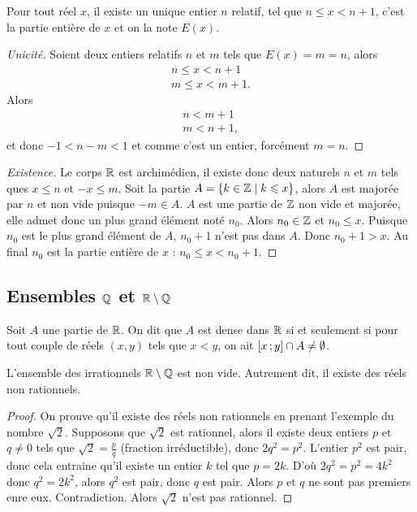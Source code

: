\begin{prop}
  Pour tout réel \(x\), il existe un unique entier \(n\) relatif, tel que
  \(n\leqslant x<n + 1\), c'est la partie entière de \(x\) et on la note
  \(E(x)\).
\end{prop}
\begin{proof}[Unicité]
  Soient deux entiers relatifs \(n\) et \(m\) tels que \(E(x) = m = n\), alors
  \begin{align}
    n\leqslant x< n + 1 \\  m\leqslant x< m + 1.
  \end{align}
  Alors
  \begin{align}
    n<m + 1 \\  m<n + 1,
  \end{align}
  et donc \( - 1<n - m<1\) et comme c'est un entier, forcément \(m = n\).
\end{proof}
\begin{proof}[Existence]
  Le corps \(\mathbb{R}\) est archimédien, il existe donc deux naturels \(n\) et \(m\)
  tels ques \(x\leqslant n\) et  \( - x\leqslant m\). Soit la partie \(A =
  \left\{k \in \mathbb{Z}\mathrel{}\middle|\mathrel{}k\leqslant x\right\}\), alors \(A\) est majorée par \(n\) et non
  vide puisque \( - m\in A\). \(A\) est une partie de \(\mathbb{Z}\) non vide et
  majorée, elle admet donc un plus grand élément noté \(n_0\). Alors \(n_0\in
  \mathbb{Z}\) et \(n_0\leqslant x\). Puisque \(n_0\) est le plus grand élément de
  \(A\), \(n_0 + 1\) n'est pas dans \(A\). Donc \(n_0 + 1>x\). Au final \(n_0\)
  est la partie entière de \(x\) : \(n_0\leqslant x<n_0 + 1\).
\end{proof}

\subsection{Ensembles \(\mathbb{Q}\) et \(\mathbb{R}\setminus\mathbb{Q}\)}

\begin{defdef}[Densité]
  Soit \(A\) une partie de \(\mathbb{R}\). On dit que \(A\) est dense dans \(\mathbb{R}\) si et
  seulement si pour tout couple de réels \((x, y)\) tels que \(x<y\), on ait
  \(\left[ x \, ; {} y \right]\cap A \neq \emptyset\).
\end{defdef}
\begin{prop}
  L'ensemble des irrationnels \(\mathbb{R}\setminus\mathbb{Q}\) est non vide. Autrement dit, il
  existe des réels non rationnels.
\end{prop}
\begin{proof}
  On prouve  qu'il existe des réels non rationnels en prenant l'exemple du
  nombre \(\sqrt{2}\). Supposons que \(\sqrt{2}\) est rationnel, alors il existe
  deux entiers \(p\) et \(q \neq 0\) tels que \(\sqrt{2} = \frac{p}{q}\)
  (fraction irréductible), donc \(2q^2 = p^2\). L'entier \(p^2\) est pair, donc
  cela entraine qu'il existe un entier \(k\) tel que \(p = 2k\). D'où \(2q^2 =
  p^2 = 4k^2\) donc \(q^2 = 2k^2\), alors \(q^2\) est pair, donc \(q\) est pair.
  Alors \(p\) et \(q\) ne sont pas premiers enre eux. Contradiction. Alors
  \(\sqrt{2}\) n'est pas rationnel.
\end{proof}


